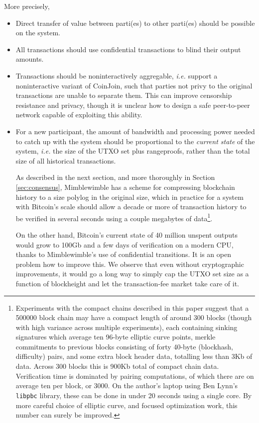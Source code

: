 \documentclass[letterpaper]{article}
\begin{document}
More precisely,
\begin{itemize}
\item Direct transfer of value between parti(es) to other parti(es)
should be possible on the system.

\item All transactions should use confidential transactions
to blind their output amounts.

\item Transactions should be noninteractively aggregable\cite{mouton2013},
\emph{i.e.} support a noninteractive variant of CoinJoin\cite{maxwell2013,maxwell2013-2},
such that parties not privy to the original transactions are unable to
separate them. This can improve censorship resistance and privacy,
though it is unclear how to design a safe peer-to-peer network capable
of exploiting this ability.

\item For a new participant, the amount of bandwidth and processing power
needed to catch up with the system should be proportional to the \emph{current
state} of the system, \emph{i.e.} the size of the UTXO set plus rangeproofs,
rather than the total size of all historical transactions.

As described in the next section, and more thoroughly in Section
\ref{sec:consensus}, Mimblewimble has a scheme for compressing blockchain
history to a size polylog in the original size, which in practice for a
system with Bitcoin's scale should allow a decade or more of transaction
history to be verified in several seconds using a couple megabytes of data\footnote{Experiments
with the compact chains described in this paper suggest that a 500000
block chain may have a compact length of around 300 blocks (though with
high variance across multiple experiments), each containing sinking
signatures which average ten 96-byte elliptic curve points, merkle
commitments to previous blocks consisting of forty 40-byte (blockhash,
difficulty) pairs, and some extra block header data, totalling less
than 3Kb of data. Across 300 blocks this is 900Kb total of compact
chain data. Verification time is dominated by pairing computations,
of which there are on average ten per block, or 3000. On the author's
laptop using Ben Lynn's \texttt{libpbc} library, these can be done
in under 20 seconds using a single core. By more careful choice of
elliptic curve, and focused optimization work, this number can surely
be improved.}.

On the other hand, Bitcoin's current state of 40 million unspent outputs
would grow to 100Gb and a few days of verification on a modern CPU, thanks
to Mimblewimble's use of confidential transitions. It is an open problem
how to improve this. We observe that even without cryptographic improvements,
it would go a long way to simply cap the UTXO set size as a function of
blockheight and let the transaction-fee market take care of it.
\end{itemize}
\end{document}
